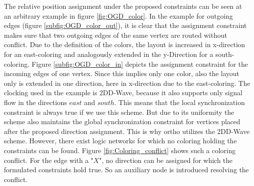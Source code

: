 The relative position assignment under the proposed constraints can be seen at an arbitrary example in figure \ref{fig:OGD_color}. In the example for outgoing edges (figure \ref{subfig:OGD_color_out}), it is clear that the assignment constraint makes sure that two outgoing edges of the same vertex are routed without conflict. Due to the definition of the colors, the layout is increased in x-direction for an east-coloring and analogously extended in the y-Direction for a south-coloring. Figure \ref{subfig:OGD_color_in} depicts the assignment constraint for the incoming edges of one vertex. Since this implies only one color, also the layout only is extended in one direction, here in x-direction due to the east-coloring. The clocking used in the example is 2DD-Wave, because it also supports only signal flow in the directions $east$ and $south$. This means that the local synchronization constraint is always true if we use this scheme. But due to its uniformity the scheme also maintains the global synchronization constraint for vertices placed after the proposed direction assignment. This is why ortho utilizes the 2DD-Wave scheme. However, there exist logic networks for which no coloring holding the constraints can be found. Figure \ref{fig:Coloring_conflict} shows such a coloring conflict. For the edge with a "$X$", no direction can be assigned for which the formulated constraints hold true. So an auxiliary node is introduced resolving the conflict.\\
